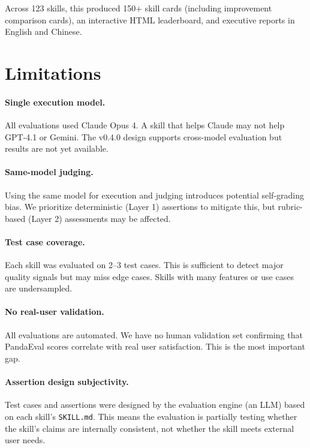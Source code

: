 \documentclass[11pt,a4paper]{article}
\begin{document}
Across 123 skills, this produced 150+ skill cards (including improvement comparison cards), an interactive HTML leaderboard, and executive reports in English and Chinese.

\section{Limitations}
\label{sec:limitations}

\paragraph{Single execution model.}
All evaluations used Claude Opus 4. A skill that helps Claude may not help GPT-4.1 or Gemini. The v0.4.0 design supports cross-model evaluation but results are not yet available.

\paragraph{Same-model judging.}
Using the same model for execution and judging introduces potential self-grading bias. We prioritize deterministic (Layer 1) assertions to mitigate this, but rubric-based (Layer 2) assessments may be affected.

\paragraph{Test case coverage.}
Each skill was evaluated on 2--3 test cases. This is sufficient to detect major quality signals but may miss edge cases. Skills with many features or use cases are undersampled.

\paragraph{No real-user validation.}
All evaluations are automated. We have no human validation set confirming that PandaEval scores correlate with real user satisfaction. This is the most important gap.

\paragraph{Assertion design subjectivity.}
Test cases and assertions were designed by the evaluation engine (an LLM) based on each skill's \texttt{SKILL.md}. This means the evaluation is partially testing whether the skill's claims are internally consistent, not whether the skill meets external user needs.
\end{document}
